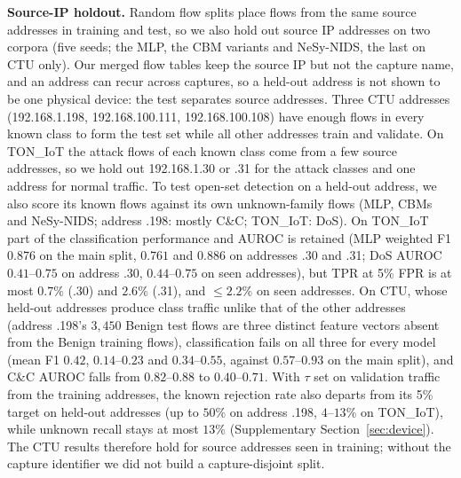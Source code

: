 \documentclass[journal]{IEEEtran}
\begin{document}
\textbf{Source-IP holdout.} Random flow splits place flows from the same source addresses in training and test, so we also hold out source IP addresses on two corpora (five seeds; the MLP, the CBM variants and NeSy-NIDS, the last on CTU only). Our merged flow tables keep the source IP but not the capture name, and an address can recur across captures, so a held-out address is not shown to be one physical device: the test separates source addresses. Three CTU addresses (192.168.1.198, 192.168.100.111, 192.168.100.108) have enough flows in every known class to form the test set while all other addresses train and validate. On TON\_IoT the attack flows of each known class come from a few source addresses, so we hold out 192.168.1.30 or .31 for the attack classes and one address for normal traffic. To test open-set detection on a held-out address, we also score its known flows against its own unknown-family flows (MLP, CBMs and NeSy-NIDS; address .198: mostly C\&C; TON\_IoT: DoS). On TON\_IoT part of the classification performance and AUROC is retained (MLP weighted F1 $0.876$ on the main split, $0.761$ and $0.886$ on addresses .30 and .31; DoS AUROC $0.41$--$0.75$ on address .30, $0.44$--$0.75$ on seen addresses), but TPR at 5\% FPR is at most $0.7\%$ (.30) and $2.6\%$ (.31), and ${\le}2.2\%$ on seen addresses. On CTU, whose held-out addresses produce class traffic unlike that of the other addresses (address .198's $3{,}450$ Benign test flows are three distinct feature vectors absent from the Benign training flows), classification fails on all three for every model (mean F1 $0.42$, $0.14$--$0.23$ and $0.34$--$0.55$, against $0.57$--$0.93$ on the main split), and C\&C AUROC falls from $0.82$--$0.88$ to $0.40$--$0.71$. With $\tau$ set on validation traffic from the training addresses, the known rejection rate also departs from its 5\% target on held-out addresses (up to $50\%$ on address .198, $4$--$13\%$ on TON\_IoT), while unknown recall stays at most $13\%$ (Supplementary Section~\ref{sec:device}). The CTU results therefore hold for source addresses seen in training; without the capture identifier we did not build a capture-disjoint split.
\end{document}
